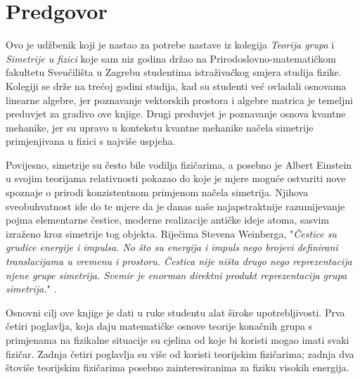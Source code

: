 

\thispagestyle{empty}

\hspace*{10ex}
\section*{Predgovor}

Ovo je udžbenik koji je nastao za potrebe nastave iz 
kolegija \emph{Teorija grupa} i \emph{Simetrije u fizici} koje
sam niz godina držao na Prirodoslovno-matematičkom fakultetu
Sveučilišta u Zagrebu studentima istraživačkog smjera studija fizike.
Kolegiji se drže na trećoj godini studija, kad
su studenti već ovladali osnovama linearne algebre, jer poznavanje
vektorskih prostora i algebre matrica je temeljni preduvjet za
gradivo ove knjige. Drugi preduvjet je poznavanje osnova kvantne
mehanike, jer su upravo u kontekstu kvantne mehanike načela simetrije
primjenjivana u fizici s najviše uspjeha.


Povijesno, simetrije su često bile vodilja fizičarima, a posebno
je Albert Einstein u svojim teorijama relativnosti pokazao do koje je
mjere moguće ostvariti nove spoznaje o prirodi konzistentnom primjenom
načela simetrija.
Njihova sveobuhvatnost ide do te mjere da je danas naše najapstraktnije
razumijevanje pojma elementarne čestice, moderne realizacije antičke ideje atoma, 
sasvim izraženo kroz simetrije tog objekta. Riječima 
Stevena Weinberga, "\emph{Čestice su grudice energije i impulsa. No što su
energija i impuls nego brojevi definirani translacijama u
vremenu i prostoru. Čestica nije ništa drugo nego
reprezentacija njene grupe simetrija. Svemir je enorman direktni produkt 
reprezentacija grupa simetrija.}" \cite{Crease:1996}.

Osnovni cilj ove knjige je dati u ruke studentu alat široke
upotrebljivosti. Prva četiri poglavlja, koja daju matematičke
osnove teorije konačnih grupa s primjenama na fizikalne situacije
su cjelina od koje bi koristi mogao imati svaki fizičar. 
Zadnja četiri poglavlja su više od koristi teorijskim fizičarima;
zadnja dva štoviše teorijskim fizičarima posebno zainteresiranima za
fiziku visokih energija.

\begin{flushleft}
\end{flushleft}

